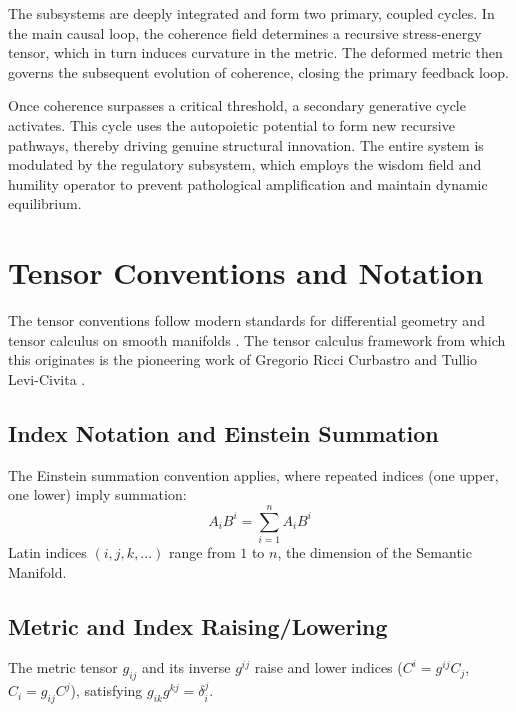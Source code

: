 The subsystems are deeply integrated and form two primary, coupled cycles. In the main causal loop, the coherence field determines a recursive stress-energy tensor, which in turn induces curvature in the metric. The deformed metric then governs the subsequent evolution of coherence, closing the primary feedback loop. 

Once coherence surpasses a critical threshold, a secondary generative cycle activates. This cycle uses the autopoietic potential to form new recursive pathways, thereby driving genuine structural innovation. The entire system is modulated by the regulatory subsystem, which employs the wisdom field and humility operator to prevent pathological amplification and maintain dynamic equilibrium.

\section{Tensor Conventions and Notation}\label{sec:tensor_conventions_and_notation}

The tensor conventions follow modern standards for differential geometry and tensor calculus on smooth manifolds \autocite{Lee2003, MisnerThorneWheeler1973}. The tensor calculus framework from which this originates is the pioneering work of Gregorio Ricci Curbastro and Tullio Levi-Civita \autocite{RicciLeviCivita1901}.

\subsection{Index Notation and Einstein Summation}\label{sec:index_notation_and_einstein_summation}

The Einstein summation convention \autocite{Einstein1916} applies, where repeated indices (one upper, one lower) imply summation:
\begin{equation}
A_i B^i = \sum_{i=1}^n A_i B^i
\end{equation}
Latin indices \((i,j,k,...)\) range from \(1\) to \(n\), the dimension of the Semantic Manifold.

\subsection{Metric and Index Raising/Lowering}\label{sec:metric_and_index_raising_lowering}

The metric tensor \(g_{ij}\) and its inverse \(g^{ij}\) raise and lower indices (\(C^i = g^{ij} C_j\), \(C_i = g_{ij} C^j\)), satisfying \(g_{ik} g^{kj} = \delta_i^j\).

